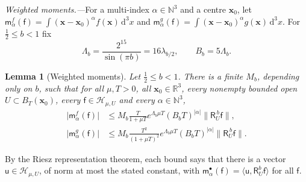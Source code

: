 \documentclass[aps,prl,reprint,longbibliography,raggedbottom]{revtex4-2}
\newtheorem{lemma}{Lemma}
\newcommand{\R}{\mathbb R}
\newcommand{\N}{\mathbb N}
\newcommand{\dd}{\,\mathrm d}
\newcommand{\norm}[1]{\lVert #1\rVert}
\newcommand{\abs}[1]{\lvert #1\rvert}
\newcommand{\ip}[2]{\langle #1,#2\rangle}
\newcommand{\Hh}{\mathcal H}
\newcommand{\Res}{\mathsf R}
\newcommand{\sx}{\mathsf f}
\newcommand{\bx}{\mathbf x}
\begin{document}
\emph{Weighted moments.---}For a multi-index $\alpha\in\N^3$ and a
centre $\bx_0$, let $\mathsf m_\alpha^f(\sx)=\int(\bx-\bx_0)^\alpha f(\bx)\dd^3x$
and $\mathsf m_\alpha^g(\sx)=\int({\bx-\bx_0})^\alpha g(\bx)\dd^3x$. For
$\frac12\le b<1$ fix
\begin{equation}
\Lambda_b=\frac{2^{15}}{\sin(\pi b)}=16\lambda_{b/2},\qquad
B_b=5\Lambda_b .
\label{eq:Lambda}
\end{equation}

\begin{lemma}[Weighted moments]\label{lem:moments}
Let $\frac12\le b<1$. There is a finite $M_b$, depending only on $b$,
such that for all $\mu,T>0$, all $\bx_0\in\R^3$, every nonempty bounded
open $U\subset B_T(\bx_0)$, every $\sx\in\Hh_{\mu,U}$ and every
$\alpha\in\N^3$,
\begin{equation}
\begin{aligned}
\abs{\mathsf m_\alpha^f(\sx)}
&\le M_b\frac{T}{1+\mu T}e^{\Lambda_b\mu T}(B_bT)^{\abs\alpha}
\norm{\Res_U^{\,b}\sx},\\
\abs{\mathsf m_\alpha^g(\sx)}
&\le M_b\frac{T^2}{(1+\mu T)^2}e^{\Lambda_b\mu T}(B_bT)^{\abs\alpha}
\norm{\Res_U^{\,b}\sx}.
\end{aligned}
\label{eq:moments}
\end{equation}
\end{lemma}

By the Riesz representation theorem, each bound says that there is a
vector $\mathsf u\in\Hh_{\mu,U}$, of norm at most the stated constant,
with $\mathsf m_\alpha^\bullet(\sx)=\ip{\mathsf u}{\Res_U^b\sx}$ for all
$\sx$.
\end{document}

